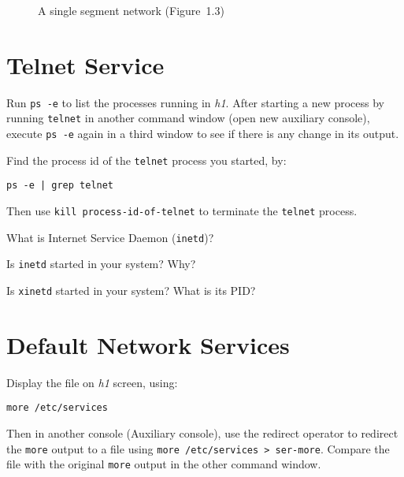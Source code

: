 \documentclass{../UTNetLab}
\begin{document}
\begin{center}
\begin{minipage}{0.48\textwidth}
\begin{flushright}
\begin{figure}[H]
                    \caption{A single segment network (Figure~1.3)}
                \end{figure}
            \end{flushright}
        \end{minipage}
    \end{center}

\section{Telnet Service}
    Run \lstinline{ps -e} to list the processes running in \textit{h1}.
    After starting a new process by running \lstinline{telnet} in another command window (open new auxiliary console), execute \lstinline{ps -e} again in a third window to see if there is any change in its output.

    Find the process id of the \lstinline{telnet} process you started, by:
    \begin{lstlisting}
ps -e | grep telnet
    \end{lstlisting}
    Then use \lstinline[emph={process-id-of-telnet}]{kill process-id-of-telnet} to terminate the \lstinline{telnet} process.
    
    \begin{report}
        \item What is Internet Service Daemon (\lstinline{inetd})?

        \item Is \lstinline{inetd} started in your system? Why?

        \item Is \lstinline{xinetd} started in your system? What is its PID?
    \end{report}

\section{Default Network Services}
    Display the file  on \textit{h1} screen, using:
    \begin{lstlisting}
more /etc/services
    \end{lstlisting}
    Then in another console (Auxiliary console), use the redirect operator to redirect the \lstinline{more} output to
    a file using \lstinline{more /etc/services > ser-more}.
    Compare the file  with the original \lstinline{more} output in the other command window.
\end{document}
